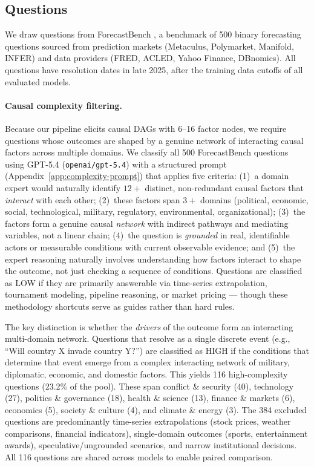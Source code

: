 \documentclass[11pt]{article}
\begin{document}
\subsection{Questions}

We draw questions from ForecastBench \cite{zou2024forecastbench}, a benchmark of 500 binary forecasting questions sourced from prediction markets (Metaculus, Polymarket, Manifold, INFER) and data providers (FRED, ACLED, Yahoo Finance, DBnomics). All questions have resolution dates in late 2025, after the training data cutoffs of all evaluated models.

\paragraph{Causal complexity filtering.} Because our pipeline elicits causal DAGs with 6--16 factor nodes, we require questions whose outcomes are shaped by a genuine network of interacting causal factors across multiple domains. We classify all 500 ForecastBench questions using GPT-5.4 (\texttt{openai/gpt-5.4}) with a structured prompt (Appendix~\ref{app:complexity-prompt}) that applies five criteria: (1)~a domain expert would naturally identify $12+$ distinct, non-redundant causal factors that \emph{interact} with each other; (2)~these factors span $3+$ domains (political, economic, social, technological, military, regulatory, environmental, organizational); (3)~the factors form a genuine causal \emph{network} with indirect pathways and mediating variables, not a linear chain; (4)~the question is \emph{grounded} in real, identifiable actors or measurable conditions with current observable evidence; and (5)~the expert reasoning naturally involves understanding how factors interact to shape the outcome, not just checking a sequence of conditions. Questions are classified as LOW if they are primarily answerable via time-series extrapolation, tournament modeling, pipeline reasoning, or market pricing --- though these methodology shortcuts serve as guides rather than hard rules.

The key distinction is whether the \emph{drivers} of the outcome form an interacting multi-domain network. Questions that resolve as a single discrete event (e.g., ``Will country X invade country Y?'') are classified as HIGH if the conditions that determine that event emerge from a complex interacting network of military, diplomatic, economic, and domestic factors. 
This yields 116 high-complexity questions (23.2\% of the pool). These span conflict \& security (40), technology (27), politics \& governance (18), health \& science (13), finance \& markets (6), economics (5), society \& culture (4), and climate \& energy (3). The 384 excluded questions are predominantly time-series extrapolations (stock prices, weather comparisons, financial indicators), single-domain outcomes (sports, entertainment awards), speculative/ungrounded scenarios, and narrow institutional decisions. All 116 questions are shared across models to enable paired comparison.
\end{document}
